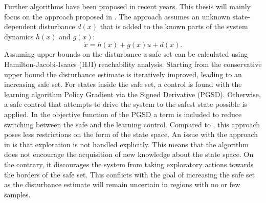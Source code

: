 \documentclass[../main.tex]{subfiles}
\begin{document}
Further algorithms have been proposed in recent years. This thesis will mainly focus on the approach proposed in \cite{akametalu2014reachability}. The approach assumes an unknown state-dependent disturbance $d(x)$ that is added to the known parts of the system dynamics $h(x)$ and $g(x)$:
\begin{equation}
    \dot{x} = h(x)+g(x)u+d(x).
\end{equation}
Assuming upper bounds on the disturbance a safe set can be calculated using Hamilton-Jacobi-Isaacs (HJI) reachability analysis. Starting from the conservative upper bound the disturbance estimate is iteratively improved, leading to an increasing safe set. For states inside the safe set, a control is found with the learning algorithm Policy Gradient via the Signed Derivative (PGSD). Otherwise, a safe control that attempts to drive the system to the safest state possible is applied. In the objective function of the PGSD a term is included to reduce switching between the safe and the learning control.
Compared to \cite{wang1993stable}, this approach poses less restrictions on the form of the state space. An issue with the approach in \cite{akametalu2014reachability} is that exploration is not handled explicitly. This means that the algorithm does not encourage the acquisition of new knowledge about the state space. On the contrary, it discourages the system from taking exploratory actions towards the borders of the safe set. This conflicts with the goal of increasing the safe set as the disturbance estimate will remain uncertain in regions with no or few samples. 
\end{document}

